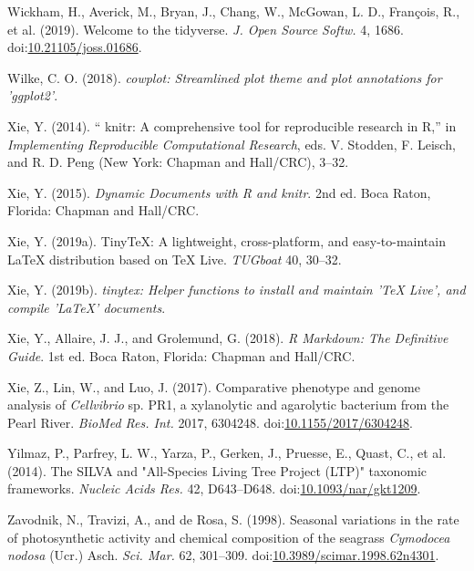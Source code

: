 \documentclass[
  12pt,
]{article}
\begin{document}
\leavevmode\hypertarget{ref-Wickham2019}{}%
Wickham, H., Averick, M., Bryan, J., Chang, W., McGowan, L. D.,
François, R., et al. (2019). Welcome to the tidyverse. \emph{J. Open
Source Softw.} 4, 1686.
doi:\href{https://doi.org/10.21105/joss.01686}{10.21105/joss.01686}.

\leavevmode\hypertarget{ref-Wilke2018}{}%
Wilke, C. O. (2018). \emph{cowplot: Streamlined plot theme and plot
annotations for 'ggplot2'}.

\leavevmode\hypertarget{ref-Xie2014}{}%
Xie, Y. (2014). `` knitr: A comprehensive tool for reproducible research
in R,'' in \emph{Implementing Reproducible Computational Research}, eds.
V. Stodden, F. Leisch, and R. D. Peng (New York: Chapman and Hall/CRC),
3--32.

\leavevmode\hypertarget{ref-Xie2015}{}%
Xie, Y. (2015). \emph{Dynamic Documents with R and knitr}. 2nd ed. Boca
Raton, Florida: Chapman and Hall/CRC.

\leavevmode\hypertarget{ref-Xie2019a}{}%
Xie, Y. (2019a). TinyTeX: A lightweight, cross-platform, and
easy-to-maintain LaTeX distribution based on TeX Live. \emph{TUGboat}
40, 30--32.

\leavevmode\hypertarget{ref-Xie2019b}{}%
Xie, Y. (2019b). \emph{tinytex: Helper functions to install and maintain
'TeX Live', and compile 'LaTeX' documents}.

\leavevmode\hypertarget{ref-Xie2018}{}%
Xie, Y., Allaire, J. J., and Grolemund, G. (2018). \emph{R Markdown: The
Definitive Guide}. 1st ed. Boca Raton, Florida: Chapman and Hall/CRC.

\leavevmode\hypertarget{ref-Xie2017}{}%
Xie, Z., Lin, W., and Luo, J. (2017). Comparative phenotype and genome
analysis of \emph{Cellvibrio} sp. PR1, a xylanolytic and agarolytic
bacterium from the Pearl River. \emph{BioMed Res. Int.} 2017, 6304248.
doi:\href{https://doi.org/10.1155/2017/6304248}{10.1155/2017/6304248}.

\leavevmode\hypertarget{ref-Yilmaz2014}{}%
Yilmaz, P., Parfrey, L. W., Yarza, P., Gerken, J., Pruesse, E., Quast,
C., et al. (2014). The SILVA and "All-Species Living Tree Project (LTP)"
taxonomic frameworks. \emph{Nucleic Acids Res.} 42, D643--D648.
doi:\href{https://doi.org/10.1093/nar/gkt1209}{10.1093/nar/gkt1209}.

\leavevmode\hypertarget{ref-Zavodnik1998}{}%
Zavodnik, N., Travizi, A., and de Rosa, S. (1998). Seasonal variations
in the rate of photosynthetic activity and chemical composition of the
seagrass \emph{Cymodocea nodosa} (Ucr.) Asch. \emph{Sci. Mar.} 62,
301--309.
doi:\href{https://doi.org/10.3989/scimar.1998.62n4301}{10.3989/scimar.1998.62n4301}.
\end{document}
